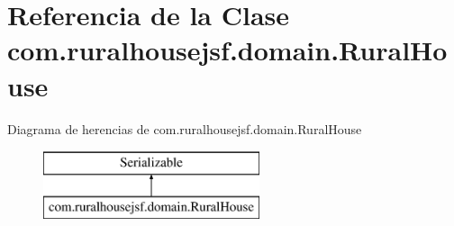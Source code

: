 \hypertarget{classcom_1_1ruralhousejsf_1_1domain_1_1_rural_house}{}\section{Referencia de la Clase com.\+ruralhousejsf.\+domain.\+Rural\+House}
\label{classcom_1_1ruralhousejsf_1_1domain_1_1_rural_house}
Diagrama de herencias de com.\+ruralhousejsf.\+domain.\+Rural\+House\begin{figure}[H]
\begin{center}
\leavevmode
\includegraphics[height=2.000000cm]{classcom_1_1ruralhousejsf_1_1domain_1_1_rural_house}
\end{center}
\end{figure}
